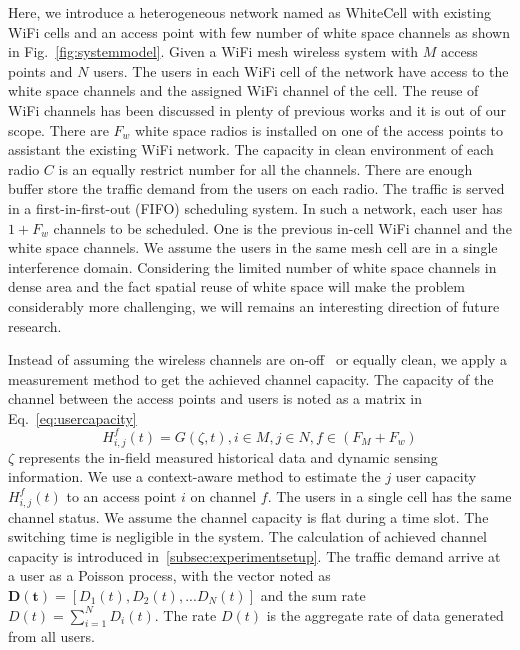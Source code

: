 Here, we introduce a heterogeneous network named as WhiteCell with existing WiFi cells and an access point 
with few number of white space channels as shown in Fig.~\ref{fig:systemmodel}.
Given a WiFi mesh wireless system with $M$ access points and $N$ users.
The users in each WiFi cell of the network have access to the white space channels and the assigned WiFi channel of the cell. 
The reuse of WiFi channels has been discussed in plenty of previous works and it is out of our scope.
There are $F_w$ white space radios is installed on one of the access points to assistant the existing WiFi 
network. 
The capacity in clean environment of each radio $C$ is an equally restrict number for all the channels. 
There are enough buffer store the traffic demand from the users on each radio. 
The traffic is served in a first-in-first-out (FIFO) scheduling system. 
In such a network, each user has $1+F_w$ channels to be scheduled. One is the previous in-cell WiFi channel 
and the white space channels. 
We assume the users in the same mesh cell are in a single interference domain. 
Considering the limited number of white space channels in dense area and the fact spatial reuse 
of white space will make the problem considerably more challenging, we will remains an interesting 
direction of future research. 


Instead of assuming the wireless channels are on-off~\cite{bodas2012low} or equally clean, we apply a  
measurement method to get the achieved channel capacity. The capacity of the channel between the access 
points and users is noted as a matrix in Eq.~\ref{eq:usercapacity}
\begin{equation}
\label{eq:usercapacity}
H_{i,j}^f(t)= G(\zeta,t),i \in M, j\in N, f \in (F_M+F_w) 
\end{equation} 
$\zeta$ represents the in-field measured historical data and dynamic sensing information.
We use a context-aware method to estimate the $j$ user capacity $H_{i,j}^f(t)$ to an access point 
$i$ on channel $f$. The users in a single cell has the same channel status. We assume the channel 
capacity is flat during a time slot. The switching time is negligible in the system.
The calculation of achieved channel capacity is introduced in~\ref{subsec:experimentsetup}. 
The traffic demand arrive at a user as a Poisson process, with the vector noted as 
$\bm{D(t)} = [D_1(t),D_2(t),...D_N(t)]$ and the sum rate $D(t) = \sum\limits_{i=1}^N D_i(t)$. 
The rate $D(t)$ is the aggregate rate of data generated from all users. 

